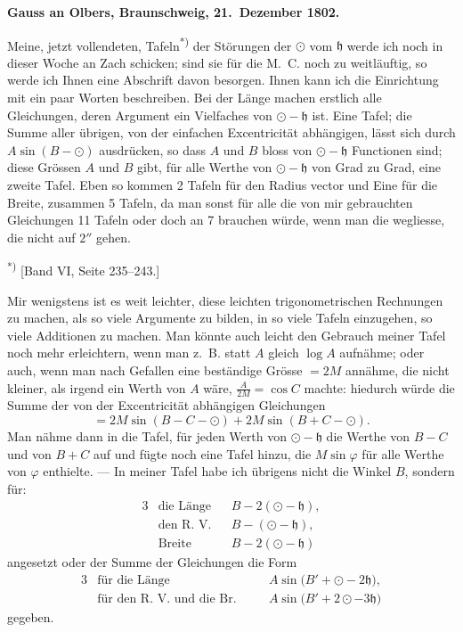 \documentclass[12pt,a4paper]{article}
\newcommand{\Ceres}{\odot}
\newcommand{\Jupiter}{\mathfrak{h}}
\begin{document}
\medskip\noindent
\textbf{Gauss an Olbers, Braunschweig, 21.~Dezember 1802.}

Meine, jetzt vollendeten, Tafeln\textsuperscript{*)} der Störungen der $\Ceres$ vom $\Jupiter$ werde ich noch in dieser Woche an Zach schicken; sind sie für die M.~C. noch zu weitläuftig, so werde ich Ihnen eine Abschrift davon besorgen. Ihnen kann ich die Einrichtung mit ein paar Worten beschreiben. Bei der Länge machen erstlich alle Gleichungen, deren Argument ein Vielfaches von $\Ceres - \Jupiter$ ist. Eine Tafel; die Summe aller übrigen, von der einfachen Excentricität abhängigen, lässt sich durch $A \sin(B - \Ceres)$ ausdrücken, so dass $A$ und $B$ bloss von $\Ceres - \Jupiter$ Functionen sind; diese Grössen $A$ und $B$ gibt, für alle Werthe von $\Ceres - \Jupiter$ von Grad zu Grad, eine zweite Tafel. Eben so kommen 2 Tafeln für den Radius vector und Eine für die Breite, zusammen 5 Tafeln, da man sonst für alle die von mir gebrauchten Gleichungen 11 Tafeln oder doch an 7 brauchen würde, wenn man die wegliesse, die nicht auf $2''$ gehen.

\smallskip\noindent\textsuperscript{*)} [Band VI, Seite 235--243.]

\newpage
\setcounter{page}{407}
%
Mir wenigstens ist es weit leichter, diese leichten trigonometrischen Rechnungen zu machen, als so viele Argumente zu bilden, in so viele Tafeln einzugehen, so viele Additionen zu machen. Man könnte auch leicht den Gebrauch meiner Tafel noch mehr erleichtern, wenn man z.~B. statt $A$ gleich $\log A$ aufnähme; oder auch, wenn man nach Gefallen eine beständige Grösse $= 2M$ annähme, die nicht kleiner, als irgend ein Werth von $A$ wäre, $\tfrac{A}{2M} = \cos C$ machte: hiedurch würde die Summe der von der Excentricität abhängigen Gleichungen
\[= 2M \sin(B - C - \Ceres) + 2M \sin(B + C - \Ceres).\]
Man nähme dann in die Tafel, für jeden Werth von $\Ceres - \Jupiter$ die Werthe von $B-C$ und von $B+C$ auf und fügte noch eine Tafel hinzu, die $M \sin \varphi$ für alle Werthe von $\varphi$ enthielte. --- In meiner Tafel habe ich übrigens nicht die Winkel $B$, sondern für:
\begin{alignat*}{3}
&\text{die Länge} && B - 2(\Ceres - \Jupiter),\\
&\text{den R.~V.} && B - (\Ceres - \Jupiter),\\
&\text{Breite} && B - 2(\Ceres - \Jupiter)
\end{alignat*}
angesetzt oder der Summe der Gleichungen die Form
\begin{alignat*}{3}
&\text{für die Länge} \quad && A \sin\bigl(B' + \Ceres - 2\Jupiter\bigr),\\
&\text{für den R.~V. und die Br.} \quad && A \sin\bigl(B' + 2\Ceres - 3\Jupiter\bigr)
\end{alignat*}
gegeben.
\end{document}
